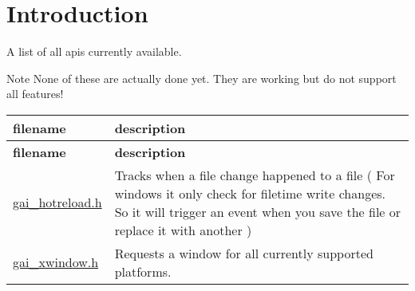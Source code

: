 \hypertarget{index_intro_sec}{}\section{Introduction}\label{index_intro_sec}
A list of all api\textquotesingle{}s currently available. \begin{DoxyNote}{Note}
None of these are actually done yet. They are working but do not support all features!
\end{DoxyNote}
\tabulinesep=1mm
\begin{longtabu} spread 0pt [c]{*{2}{|X[-1]}|}
\hline
\rowcolor{\tableheadbgcolor}\textbf{ filename }&\textbf{ description  }\\
\endfirsthead
\hline
\endfoot
\hline
\rowcolor{\tableheadbgcolor}\textbf{ filename }&\textbf{ description  }\\
\endhead
\hyperlink{gai__hotreload_8h}{gai\+\_\+hotreload.\+h} &Tracks when a file change happened to a file ( For windows it only check for filetime write changes. So it will trigger an event when you save the file or replace it with another ) \\
\hyperlink{gai__xwindow_8h}{gai\+\_\+xwindow.\+h} &Requests a window for all currently supported platforms. \\
\end{longtabu}
